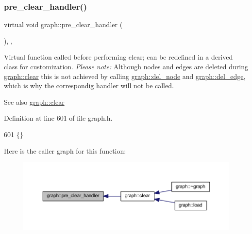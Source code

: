 \mbox{\label{classgraph_a16ccad78837d16be59854549cd2d847a}} 
\subsubsection{\texorpdfstring{pre\+\_\+clear\+\_\+handler()}{pre\_clear\_handler()}}
{\footnotesize\ttfamily virtual void graph\+::pre\+\_\+clear\+\_\+handler (\begin{DoxyParamCaption}{ }\end{DoxyParamCaption})\hspace{0.3cm}{\ttfamily [inline]}, {\ttfamily [virtual]}, {\ttfamily [inherited]}}

Virtual function called before performing clear; can be redefined in a derived class for customization. {\itshape Please note\+:} Although nodes and edges are deleted during \mbox{\hyperlink{classgraph_a9ff5d6af3653e79f87b836701453f55a}{graph\+::clear}} this is not achieved by calling \mbox{\hyperlink{classgraph_a8bdc09d5b9ac4bd26586b054d8fcbe91}{graph\+::del\+\_\+node}} and \mbox{\hyperlink{classgraph_ad9356508c49c542dfd4b7169297387c6}{graph\+::del\+\_\+edge}}, which is why the correspondig handler will not be called.

\begin{DoxySeeAlso}{See also}
\mbox{\hyperlink{classgraph_a9ff5d6af3653e79f87b836701453f55a}{graph\+::clear}} 
\end{DoxySeeAlso}


Definition at line 601 of file graph.\+h.


\begin{DoxyCode}
601 \{\}
\end{DoxyCode}
Here is the caller graph for this function\+:
\nopagebreak
\begin{figure}[H]
\begin{center}
\leavevmode
\includegraphics[width=350pt]{classgraph_a16ccad78837d16be59854549cd2d847a_icgraph}
\end{center}
\end{figure}
\mbox{\label{classgraph_a2cd0986dc5bcbfdbf0635c39e610784b}} 

